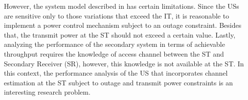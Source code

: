 \documentclass[12pt, draftclsnofoot, onecolumn]{IEEEtran}
\begin{document}
However, the system model described in \cite{Kaushik15} has certain limitations. Since the USs are sensitive only to those variations that exceed the IT, it is reasonable to implement a power control mechanism subject to an outage constraint. Besides that, the transmit power at the ST should not exceed a certain value. Lastly, analyzing the performance of the secondary system in terms of achievable throughput requires the knowledge of access channel between the ST and Secondary Receiver (SR), however, this knowledge is not available at the ST. In this context, the performance analysis of the US that incorporates channel estimation at the ST subject to outage and transmit power constraints is an interesting research problem. %

\end{document}
